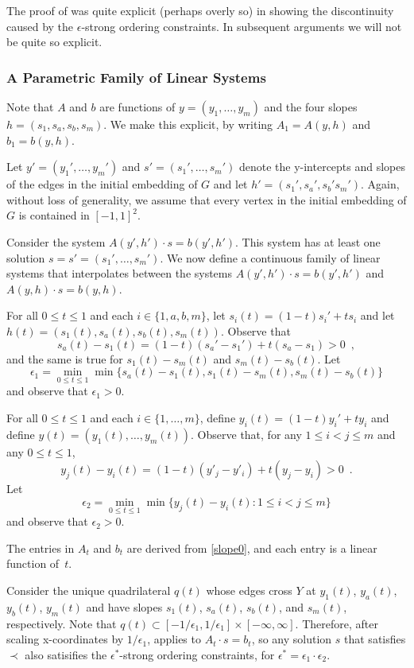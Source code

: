 \documentclass{patmorin}
\begin{document}
The proof of  was quite explicit (perhaps overly so)
in showing the discontinuity caused by the $\epsilon$-strong ordering
constraints.  In subsequent arguments we will not be quite so explicit.

\subsubsection{A Parametric Family of Linear Systems}

Note that $A$ and $b$ are functions of $y=(y_1,\ldots,y_m)$ and the
four slopes $h=(s_1,s_a,s_b,s_m)$. We make this explicit, by writing
$A_1=A(y,h)$ and $b_1=b(y,h)$.

Let $y'=(y_1',\ldots,y_m')$ and $s'=(s_1',\ldots,s_m')$ denote the
y-intercepts and slopes of the edges in the initial embedding of $G$
and let $h'=(s_1',s_a',s_b's_m')$.
Again, without loss of generality, we assume that every vertex in the initial embedding of $G$ is contained in $[-1,1]^2$.

Consider the system $A(y',h')\cdot s = b(y',h')$.  This system has
at least one solution $s=s'=(s_1',\ldots,s_m')$.  We now define
a continuous family of linear systems that interpolates between the
systems $A(y',h')\cdot s=b(y',h')$ and $A(y,h)\cdot s=b(y,h)$.

For all $0\le t\le 1$ and each $i\in\{1,a,b,m\}$, 
let $s_i(t)=(1-t)s_i' + ts_i$ and let
$h(t)=(s_1(t),s_a(t),s_b(t),s_m(t))$.
Observe that
\[  
    s_a(t)-s_1(t) = (1-t)(s_a'-s_1') + t(s_a-s_1) > 0 \enspace ,
\]
and the same is true for $s_1(t)-s_m(t)$ and $s_m(t)-s_b(t)$.  Let
\[
     \epsilon_1 = \min_{0\le t\le 1}\min\{s_a(t)-s_1(t), s_1(t)-s_m(t), s_m(t)-s_b(t)\}
\]
and observe that $\epsilon_1>0$.

For all $0\le t\le 1$ and each $i\in\{1,\ldots,m\}$, define $y_i(t) = (1-t)y_i' + ty_i$ and define $y(t)=(y_1(t),\ldots,y_m(t))$.
Observe that, for any
$1\le i< j\le m$ and any $0\le t\le 1$,
\[
   y_j(t) - y_i(t) = (1-t)(y'_j-y'_i) + t(y_j-y_i) > 0 \enspace .
\]
Let 
\[    \epsilon_2=\min_{0\le t\le 1}\min\{y_j(t)-y_i(t): 1\le i< j\le m\}
\]
and observe that $\epsilon_2 >0$.  

The entries in $A_t$ and $b_t$ are derived from \eqref{slope0}, and
each entry is a linear function of~$t$.  

Consider the unique quadrilateral $q(t)$ whose edges cross $Y$ at
$y_1(t)$, $y_a(t)$, $y_b(t)$, $y_m(t)$ and have slopes $s_1(t)$,
$s_a(t)$, $s_b(t)$, and $s_m(t)$, respectively.  Note that
$q(t)\subset[-1/\epsilon_1,1/\epsilon_1]\times[-\infty,\infty]$.
Therefore, after scaling x-coordinates by $1/\epsilon_1$,
 applies to $A_t\cdot s =b_t$, so any solution $s$
that satisfies $\prec$ also satisifies the $\epsilon^*$-strong ordering
constraints, for $\epsilon^*=\epsilon_1\cdot\epsilon_2$.
\end{document}
